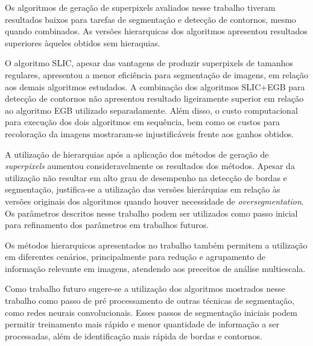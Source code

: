 \begin{document}
Os algoritmos de geração de superpixels avaliados nesse trabalho tiveram resultados baixos para tarefas de segmentação e detecção de contornos, mesmo quando combinados. As versões hierarquicas dos algoritmos apresentou resultados superiores àqueles obtidos sem hieraquias.

O algoritmo SLIC, apesar das vantagens de produzir superpixels de tamanhos regulares, apresentou a menor eficiência para segmentação de imagens, em relação aos demais algoritmos estudados. A combinação dos algoritmos SLIC+EGB para detecção de contornos não apresentou resultado ligeiramente  superior em relação ao algoritmo EGB utilizado separadamente. Além disso, o custo computacional para execução dos dois algoritmos em sequência, bem como os custos para recoloração da imagens mostraram-se injustificáveis frente aos ganhos obtidos.

A utilização de hierarquias após a aplicação dos métodos de geração de \textit{superpixels} aumentou consideravelmente os resultados dos métodos. Apesar da utilização não resultar em alto grau de desempenho na detecção de bordas e segmentação, justifica-se a utilização das versões hierárquias em relação às versões originais dos algoritmos quando houver necessidade de \textit{oversegmentation}. Os parâmetros descritos nesse trabalho podem ser utilizados como passo inicial para refinamento dos parâmetros em trabalhos futuros.

Os métodos hierarquicos apresentados no trabalho também permitem a utilização em diferentes cenários, principalmente para redução e agrupamento de informação relevante em imagens, atendendo aos preceitos de análise multiescala.

Como trabalho futuro sugere-se a utilização dos algoritmos mostrados nesse trabalho como passo de pré processamento de outras técnicas de segmentação, como redes neurais convolucionais. Esses passos de segmentação iniciais podem permitir treinamento mais rápido e menor quantidade de informação a ser processadas, além de identificação mais rápida de bordas e contornos.




\end{document}
